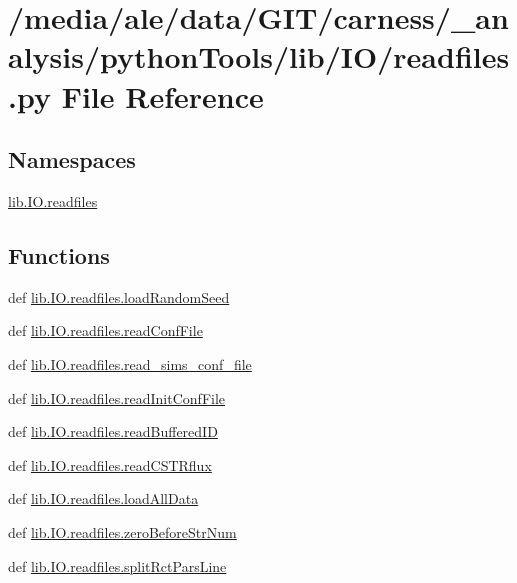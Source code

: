 \hypertarget{a00056}{\section{/media/ale/data/\-G\-I\-T/carness/\-\_\-analysis/python\-Tools/lib/\-I\-O/readfiles.py File Reference}
\label{a00056}
}
\subsection*{Namespaces}
\begin{DoxyCompactItemize}
\item 
\hyperlink{a00113}{lib.\-I\-O.\-readfiles}
\end{DoxyCompactItemize}
\subsection*{Functions}
\begin{DoxyCompactItemize}
\item 
def \hyperlink{a00113_a35bd9157c0887704488cc0e2c50bf127}{lib.\-I\-O.\-readfiles.\-load\-Random\-Seed}
\item 
def \hyperlink{a00113_aa0985f97c9159003c7a4bd44d1a989f3}{lib.\-I\-O.\-readfiles.\-read\-Conf\-File}
\item 
def \hyperlink{a00113_a05887f4cca56e48fcb1be55b6b8f5a9b}{lib.\-I\-O.\-readfiles.\-read\-\_\-sims\-\_\-conf\-\_\-file}
\item 
def \hyperlink{a00113_af8a2deca70e9e04a4c4812d81430df19}{lib.\-I\-O.\-readfiles.\-read\-Init\-Conf\-File}
\item 
def \hyperlink{a00113_a4a56e157e25982ad4a7dedd03929dcd6}{lib.\-I\-O.\-readfiles.\-read\-Buffered\-I\-D}
\item 
def \hyperlink{a00113_ab6d9ae4f9d3c52b2aad8b50d9b110dc1}{lib.\-I\-O.\-readfiles.\-read\-C\-S\-T\-Rflux}
\item 
def \hyperlink{a00113_a5ddfb684cfa43cb2aa2d8246078c486c}{lib.\-I\-O.\-readfiles.\-load\-All\-Data}
\item 
def \hyperlink{a00113_a30cdb91109c2d6ea6e0abb808fe88c6f}{lib.\-I\-O.\-readfiles.\-zero\-Before\-Str\-Num}
\item 
def \hyperlink{a00113_a3a9416927822cf24fb30e1d57bf71412}{lib.\-I\-O.\-readfiles.\-split\-Rct\-Pars\-Line}
\end{DoxyCompactItemize}
